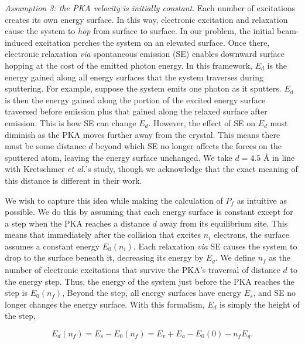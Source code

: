 \documentclass[twoside,twocolumn,9pt]{article}
\begin{document}
\medskip\noindent
\textit{Assumption 3: the PKA velocity is initially constant}.
Each number of excitations creates its own energy surface.  In this way,
electronic excitation and relaxation cause the system to \textit{hop} from
surface to surface.  In our problem, the initial beam-induced excitation
perches the system on an elevated surface.  Once there, electronic relaxation
\textit{via} spontaneous emission (SE) enables downward surface hopping at the cost
of the emitted photon energy.
In this framework, $E_d$ is the energy gained along all energy surfaces
that the system traverses during sputtering.  For example, suppose the system
emits one photon as it sputters.  $E_d$ is then the energy gained along the
portion of the excited energy surface traversed before emission plus that
gained along the relaxed surface after emission.
This is how SE can change $E_d$.
However, the effect of SE on $E_d$ must diminish as the PKA moves further away
from the crystal.
This means there must be some distance $d$ beyond which SE no
longer affects the forces on the sputtered atom, leaving the energy surface
unchanged.
We take $d=4.5$ {\AA} in line with Kretschmer \textit{et al.}'s study, though we
acknowledge that the exact meaning of this distance is different in their work.
\cite{Kretschmer2020}

We wish to capture this idea while making the calculation of $P_f$ as
intuitive as possible.
We do this by assuming that each energy surface is constant except for a step
when the PKA reaches a distance $d$ away from its equilibrium site.
This means that immediately after the collision that excites $n_i$ electrons,
the surface assumes a constant energy $E_0(n_i)$.
Each relaxation \textit{via} SE causes the system to drop to the surface beneath it,
decreasing its energy by $E_g$.
We define $n_f$ as the number of electronic excitations that survive the PKA's
traversal of distance $d$ to the energy step.
Thus, the energy of the system just before the PKA reaches the step is
$E_0(n_f)$,
Beyond the step, all energy surfaces have energy $E_s$, and SE no longer
changes the energy surface. 
With this formalism, $E_d$ is simply the height of the step,

\begin{equation}
  E_d(n_f) = E_s - E_0(n_f) = E_v + E_a - E_0(0) - n_f E_g.
  \label{eq:Ed}
\end{equation}
\end{document}
